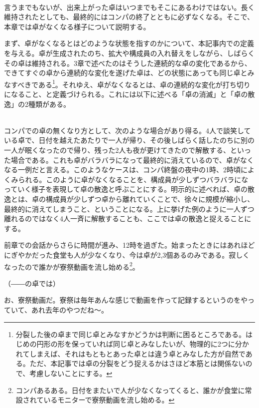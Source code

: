 \begin{multicols}{2}
\\
言うまでもないが、出来上がった卓はいつまでもそこにあるわけではない。長く維持されたとしても、最終的にはコンパの終了とともに必ずなくなる。そこで、本章では卓がなくなる様子について説明する。
\par
まず、卓がなくなるとはどのような状態を指すのかについて、本記事内での定義を与える。卓が生成されたのち、拡大や構成員の入れ替えをしながら、しばらくその卓は維持される。3章で述べたのはそうした連続的な卓の変化であるから、できてすぐの卓から連続的な変化を遂げた卓は、どの状態にあっても同じ卓とみなすべきである\footnote{分裂した後の卓まで同じ卓とみなすかどうかは判断に困るところである。はじめの円形の形を保っていれば同じ卓とみなしたいが、物理的に2つに分かれてしまえば、それはもともとあった卓とは違う卓とみなした方が自然である。ただ、本記事では卓の分裂をどう捉えるかはさほど本筋とは関係ないので、考慮しないことにする。}。それゆえ、卓がなくなるとは、卓の連続的な変化が打ち切りになること、と定義づけられる。これには以下に述べる「卓の消滅」と「卓の散逸」の2種類がある。

\\
コンパでの卓の無くなり方として、次のような場合があり得る。4人で談笑している卓で、日付を越えたあたりで一人が帰り、その後しばらく話したのちに別の一人が眠くなったので帰り、残った2人も夜が更けてきたので解散する、といった場合である。これも卓がバラバラになって最終的に消えているので、卓がなくなる一例だと言える。このようなケースは、コンパ終盤の夜中の1時、2時頃によくみられる。このように卓がなくなることを、構成員が少しずつバラバラになっていく様子を表現して卓の散逸と呼ぶことにする。明示的に述べれば、卓の散逸とは、卓の構成員が少しずつ卓から離れていくことで、徐々に規模が縮小し、最終的に消えてしまうこと、ということになる。上に挙げた例のように一人ずつ離れるのではなく4人一斉に解散することも、ここでは卓の散逸と捉えることにする。
\par
\dotfill
\par
前章での会話からさらに時間が進み、12時を過ぎた。始まったときにはあれほどにぎやかだった食堂も人が少なくなり、今は卓が2,3個あるのみである。寂しくなったので誰かが寮祭動画を流し始める\footnote{コンパあるある。日付をまたいで人が少なくなってくると、誰かが食堂に常設されているモニターで寮祭動画を流し始める。}。
\par
（――の卓では）
\par
{}
お、寮祭動画だ。寮祭は毎年あんな感じで動画を作って記録するというのをやっていて、あれ去年のやつだね～。


\end{multicols}
